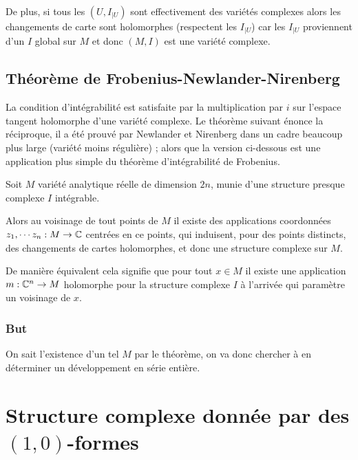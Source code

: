 \documentclass[a4paper,draft]{amsart}
\begin{document}
De plus, si tous les $(U,I_{\vert U})$ sont effectivement des variétés complexes alors les changements de carte sont holomorphes (respectent les $I_{\vert U}$) car les $I_{\vert U}$ proviennent d'un $I$ global sur $M$ et donc $(M,I)$ est une variété complexe.

\subsection{Théorème de Frobenius-Newlander-Nirenberg} La condition d'intégrabilité est satisfaite par la multiplication par $i$ sur l'espace tangent holomorphe d'une variété complexe. Le théorème suivant énonce la réciproque, il a été prouvé par Newlander et Nirenberg dans un cadre beaucoup plus large (variété moins régulière) ; alors que la version ci-dessous est une application plus simple du théorème d'intégrabilité de Frobenius.
\begin{thm}
Soit $M$ variété analytique réelle de dimension $2n$, munie d'une structure presque complexe $I$ intégrable.

Alors au voisinage de tout points de $M$ il existe des applications coordonnées $z_1,\cdots z_n: M \rightarrow \mathbb{C}$ centrées en ce points, qui induisent, pour des points distincts, des changements de cartes holomorphes, et donc une structure complexe sur $M$.
\end{thm}

De manière équivalent cela signifie que pour tout $x\in M$ il existe une application $m : \mathbb{C}^n \rightarrow M$ holomorphe pour la structure complexe $I$ à l'arrivée qui paramètre un voisinage de $x$.
\subsubsection{But} On sait l'existence d'un tel $M$ par le théorème, on va donc chercher à en déterminer un développement en série entière.

\section{Structure complexe donnée par des $(1,0)$-formes}
\end{document}
